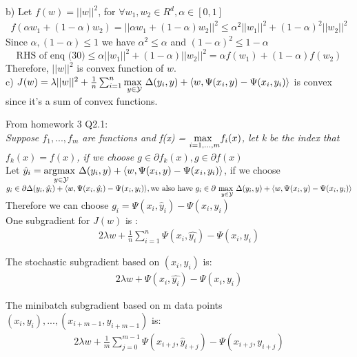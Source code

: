 \documentclass{article}
\newenvironment{sub}[2][$-$]{\begin{trivlist}
		\item[\hskip \labelsep {\bfseries #1}\hskip \labelsep {\bfseries #2.}]}  {\end{trivlist}}
\begin{document}
b) Let $f(w) = ||w||^2$, for $\forall w_1, w_2 \in R^d, \alpha \in [0,1]$
\begin{align}
f(\alpha w_1 + (1 - \alpha) w_2) = ||\alpha w_1 + (1 - \alpha) w_2||^2 \leq  \alpha^2|| w_1||^2 + (1-\alpha)^2|| w_2||^2
\end{align}
Since $\alpha, (1-\alpha) \leq 1$ we have $\alpha^2 \leq \alpha$ and  $(1-\alpha)^2 \leq 1-\alpha$
$$\text{RHS of enq (30)} \leq \alpha|| w_1||^2 + (1-\alpha)|| w_2||^2 = \alpha f(w_1) + (1 - \alpha) f(w_2)$$
Therefore, $||w||^2$ is convex function of $w$.\\

c) $J(w) = \lambda ||w||^2 + \frac{1}{n} \sum_{i=1}^{n}\underset{y \in \mathcal{Y}}{\operatorname{max \hspace{0.05 in}}} \Delta(y_i,y)   +\langle w, \Psi(x_i,y) - \Psi(x_i,y_i) \rangle $ is convex since it's a sum of convex functions. 

\begin{sub}{5.2}
\end{sub}
From homework 3 Q2.1:\\

\textit{Suppose $f_1,...,f_m$ are functions and f(x) = 	$\underset{i = 1,...,m}{\operatorname{max \hspace{0.05 in}}} f_i(x)$, let k be the index that $f_k(x)= f(x)$, if we choose $g \in \partial f_k(x), g\in \partial f(x)$}\\

Let $\hat{y}_i = \underset{y \in \mathcal{Y}}{\operatorname{argmax \hspace{0.05 in}}} \Delta(y_i,y)   +\langle w, \Psi(x_i,y) - \Psi(x_i,y_i) \rangle  $, if we choose $g_i \in \partial \Delta(y_i,\hat{y_i})   +\langle w, \Psi(x_i,\hat{y_i}) - \Psi(x_i,y_i) \rangle,\\ \text{we also have } g_i \in  \partial \hspace{0.05in} \underset{y \in \mathcal{Y}}{\operatorname{max \hspace{0.05 in}}} \Delta(y_i,y)   +\langle w, \Psi(x_i,y) - \Psi(x_i,y_i) \rangle $\\
Therefore we can choose $g_i = \Psi(x_i,\hat{y}_i) - \Psi(x_i,y_i) $\\
One subgradient for $J(w)$ is :
\begin{align}2\lambda w + \frac{1}{n} \sum_{i=1}^{n}  \Psi(x_i,\hat{y_i}) - \Psi(x_i,y_i) \end{align}

\begin{sub}{5.3}
\end{sub}
The stochastic subgradient based on $(x_i,y_i)$ is:
\begin{align}
2\lambda w +  \Psi(x_i,\hat{y_i}) - \Psi(x_i,y_i) 
\end{align}

\begin{sub}{5.4}
\end{sub}
The minibatch subgradient based on m data points $(x_i,y_i),..., (x_{i+m-1}, y_{i+m-1})$ is:\\
\begin{align}
2\lambda w + \frac{1}{m}  \sum_{j=0}^{m-1}  \Psi(x_{i+j},\hat{y}_{i+j}) - \Psi(x_{i+j},y_{i+j})
\end{align}
 
\end{document}
